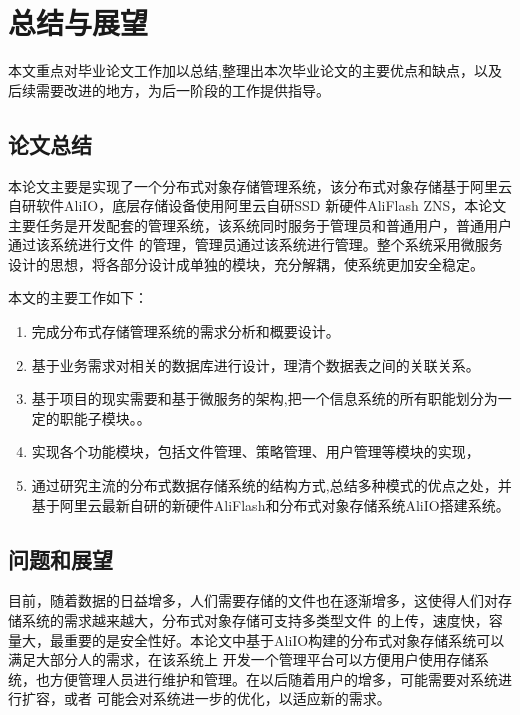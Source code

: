 \chapter{总结与展望}

本文重点对毕业论文工作加以总结,整理出本次毕业论文的主要优点和缺点，以及后续需要改进的地方，为后一阶段的工作提供指导。

\section{论文总结}

本论文主要是实现了一个分布式对象存储管理系统，该分布式对象存储基于阿里云自研软件AliIO，底层存储设备使用阿里云自研SSD
新硬件AliFlash ZNS，本论文主要任务是开发配套的管理系统，该系统同时服务于管理员和普通用户，普通用户通过该系统进行文件
的管理，管理员通过该系统进行管理。整个系统采用微服务设计的思想，将各部分设计成单独的模块，充分解耦，使系统更加安全稳定。

本文的主要工作如下：

\begin{enumerate}
    \item 完成分布式存储管理系统的需求分析和概要设计。
    \item 基于业务需求对相关的数据库进行设计，理清个数据表之间的关联关系。
    \item 基于项目的现实需要和基于微服务的架构,把一个信息系统的所有职能划分为一定的职能子模块。。
    \item 实现各个功能模块，包括文件管理、策略管理、用户管理等模块的实现，
    \item 通过研究主流的分布式数据存储系统的结构方式,总结多种模式的优点之处，并基于阿里云最新自研的新硬件AliFlash和分布式对象存储系统AliIO搭建系统。
\end{enumerate}

\section{问题和展望}

目前，随着数据的日益增多，人们需要存储的文件也在逐渐增多，这使得人们对存储系统的需求越来越大，分布式对象存储可支持多类型文件
的上传，速度快，容量大，最重要的是安全性好。本论文中基于AliIO构建的分布式对象存储系统可以满足大部分人的需求，在该系统上
开发一个管理平台可以方便用户使用存储系统，也方便管理人员进行维护和管理。在以后随着用户的增多，可能需要对系统进行扩容，或者
可能会对系统进一步的优化，以适应新的需求。
